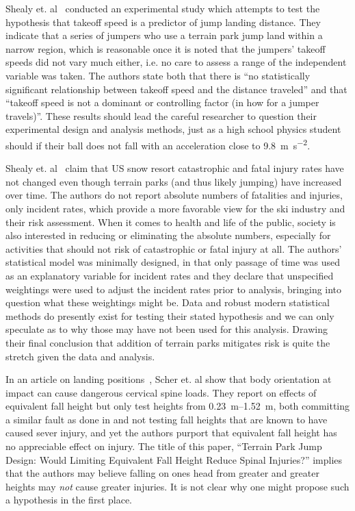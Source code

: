 \documentclass{article}
\begin{document}
Shealy et. al~\cite{Shealy2010} conducted an experimental study which attempts
to test the hypothesis that takeoff speed is a predictor of jump landing
distance. They indicate that a series of jumpers who use a terrain park jump
land within a narrow region, which is reasonable once it is noted that the
jumpers' takeoff speeds did not vary much either, i.e. no care to assess a
range of the independent variable was taken. The authors state both that there
is ``no statistically significant relationship between takeoff speed and the
distance traveled'' and that ``takeoff speed is not a dominant or controlling
factor (in how for a jumper travels)''. These results should lead the careful
researcher to question their experimental design and analysis methods, just as
a high school physics student should if their ball does not fall with an
acceleration close to 9.8~\si{\meter\per\second\squared}.

Shealy et. al~\cite{Shealy2015} claim that US snow resort catastrophic and
fatal injury rates have not changed even though terrain parks (and thus likely
jumping) have increased over time. The authors do not report absolute numbers
of fatalities and injuries, only incident rates, which provide a more favorable
view for the ski industry and their risk assessment. When it comes to health
and life of the public, society is also interested in reducing or eliminating
the absolute numbers, especially for activities that should not risk of
catastrophic or fatal injury at all. The authors' statistical model was
minimally designed, in that only passage of time was used as an explanatory
variable for incident rates and they declare that unspecified weightings were
used to adjust the incident rates prior to analysis, bringing into question
what these weightings might be.  Data and robust modern statistical methods do
presently exist for testing their stated hypothesis and we can only speculate
as to why those may have not been used for this analysis. Drawing their final
conclusion that addition of terrain parks mitigates risk is quite the stretch
given the data and analysis.

In an article on landing positions~\cite{Scher2015}, Scher et. al show that
body orientation at impact can cause dangerous cervical spine loads. They
report on effects of equivalent fall height but only test heights from
\SIrange{0.23}{1.52}{\meter}, both committing a similar fault as done in
\cite{Shealy2010} and not testing fall heights that are known to have caused
sever injury, and yet the authors purport that equivalent fall height has no
appreciable effect on injury. The title of this paper, ``Terrain Park Jump
Design: Would Limiting Equivalent Fall Height Reduce Spinal Injuries?'' implies
that the authors may believe falling on ones head from greater and greater
heights may \emph{not} cause greater injuries. It is not clear why one might
propose such a hypothesis in the first place.
\end{document}
